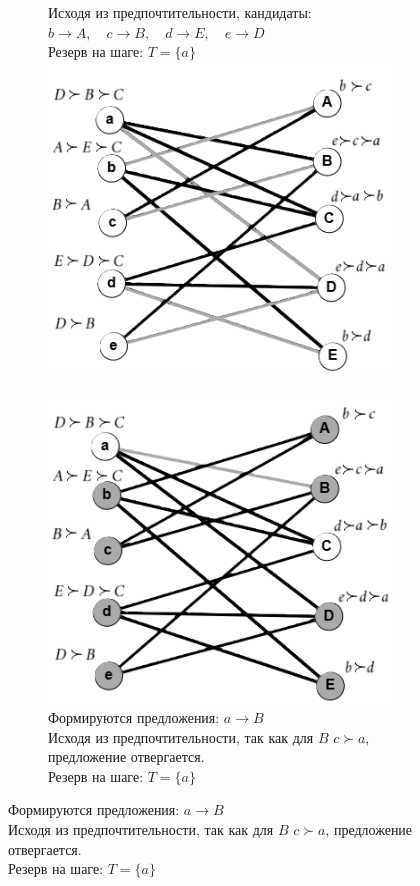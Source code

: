 \documentclass{article}
\begin{document}
\begin{enumerate}
\begin{figure}
\begin{subfigure}[b]{0.47\textwidth}
{         Исходя из предпочтительности, кандидаты:\\ 
         $b\rightarrow A,\quad c\rightarrow B,\quad d\rightarrow E,\quad e\rightarrow D$ \\
         Резерв на шаге:
         $T =\{a\}$}
         \includegraphics[width=\textwidth]{attachments/11/11.png}
         \label{fig:to_bin_11_1}
     \end{subfigure}
     \hfill
          \begin{subfigure}[b]{0.47\textwidth}
        \centering
         \caption*{Формируются предложения: $a\rightarrow B$ \\
         Исходя из предпочтительности, так как для $B$ $c \succ a$, предложение отвергается.\\
         Резерв на шаге:
         $T =\{a\}$}
         \includegraphics[width=\textwidth]{attachments/11/22.png}

\end{subfigure}
\end{figure}
\end{enumerate}
\end{document}
